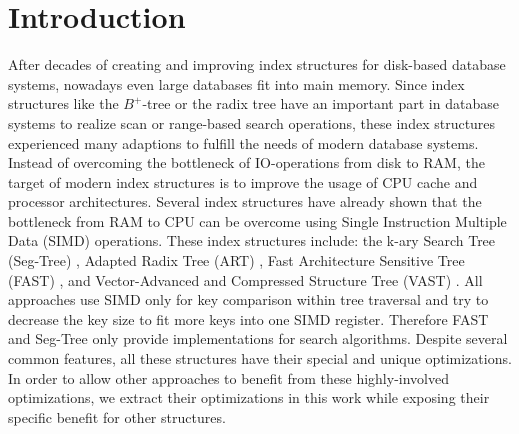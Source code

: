 \documentclass[runningheads,a4paper]{llncs}
\begin{document}
\section{Introduction}
After decades of creating and improving index structures for disk-based database systems, nowadays even large databases fit into main memory. Since index structures like the $B^+$-tree or the radix tree have an important part in database systems to realize scan or range-based search operations, these index structures experienced many adaptions to fulfill the needs of modern database systems. Instead of overcoming the bottleneck of IO-operations from disk to RAM, the target of modern index structures is to improve the usage of CPU cache and processor architectures.
Several index structures have already shown that the bottleneck from RAM to CPU can be overcome using Single Instruction Multiple Data (SIMD) \cite{suaib2011architecture} operations. These index structures include: the k-ary Search Tree (Seg-Tree) \cite{zeuch2014adapting}, Adapted Radix Tree (ART) \cite{leis2013adaptive}, Fast Architecture Sensitive Tree (FAST) \cite{kim2010fast}, and Vector-Advanced and Compressed Structure Tree (VAST) \cite{yamamuro2012vast}. %
All approaches use SIMD only for key comparison within tree traversal and try to decrease the key size to fit more keys into one SIMD register. Therefore FAST and Seg-Tree only provide implementations for search algorithms. Despite several common features, all these structures have their special and unique optimizations. In order to allow other approaches to benefit from these highly-involved optimizations, we extract their optimizations in this work while exposing their specific benefit for other structures.
\end{document}
